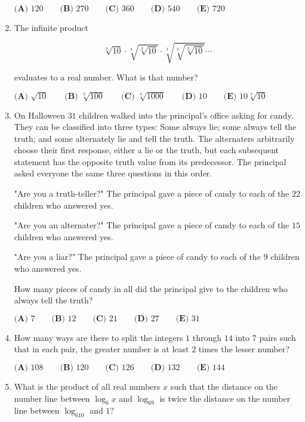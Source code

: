 \documentclass{article}
\begin{document}
\begin{enumerate}[label=\arabic*., itemsep=0.5em]
\(\textbf{(A) }120\qquad\textbf{(B) }270\qquad\textbf{(C) }360\qquad\textbf{(D) }540\qquad\textbf{(E) }720\)\par \vspace{0.5em}\item The infinite product

\begin{equation*}
\sqrt[3]{10} \cdot \sqrt[3]{\sqrt[3]{10}} \cdot \sqrt[3]{\sqrt[3]{\sqrt[3]{10}}} \cdots
\end{equation*}

evaluates to a real number. What is that number?

\(\textbf{(A) }\sqrt{10}\qquad\textbf{(B) }\sqrt[3]{100}\qquad\textbf{(C) }\sqrt[4]{1000}\qquad\textbf{(D) }10\qquad\textbf{(E) }10\sqrt[3]{10}\)\par \vspace{0.5em}\item On Halloween \(31\) children walked into the principal's office asking for candy. They
can be classified into three types: Some always lie; some always tell the truth; and
some alternately lie and tell the truth. The alternaters arbitrarily choose their first
response, either a lie or the truth, but each subsequent statement has the opposite
truth value from its predecessor. The principal asked everyone the same three
questions in this order.

"Are you a truth-teller?" The principal gave a piece of candy to each of the \(22\)
children who answered yes.

"Are you an alternater?" The principal gave a piece of candy to each of the \(15\)
children who answered yes.

"Are you a liar?" The principal gave a piece of candy to each of the \(9\) children who
answered yes.

How many pieces of candy in all did the principal give to the children who always
tell the truth?

\(\textbf{(A) } 7 \qquad \textbf{(B) } 12 \qquad \textbf{(C) } 21 \qquad \textbf{(D) } 27 \qquad \textbf{(E) } 31\)\par \vspace{0.5em}\item How many ways are there to split the integers \(1\) through \(14\) into \(7\) pairs such that in each pair, the greater number is at least \(2\) times the lesser number?

\(\textbf{(A) } 108 \qquad \textbf{(B) } 120 \qquad \textbf{(C) } 126 \qquad \textbf{(D) } 132 \qquad \textbf{(E) } 144\)\par \vspace{0.5em}\item What is the product of all real numbers \(x\) such that the distance on the number line between \(\log_6x\) and \(\log_69\) is twice the distance on the number line between \(\log_610\) and \(1\)?


\end{enumerate}
\end{document}

